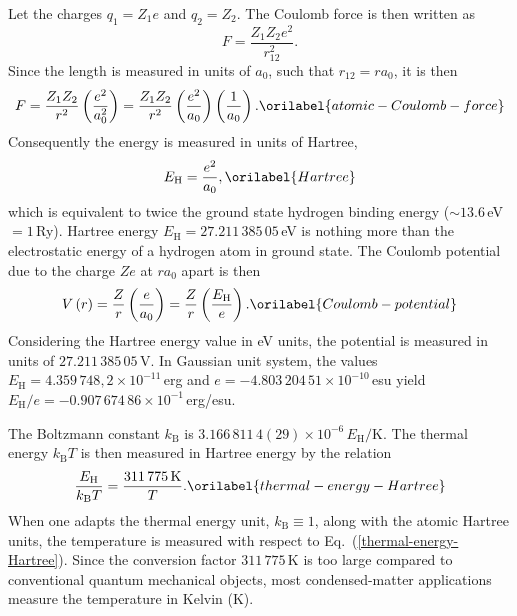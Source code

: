 \documentclass[aps,showkeys,noshowpacs,superscriptaddress,pre,preprint]{revtex4-2}
\let\label\orilabel
\begin{document}
Let the charges $q_1 = Z_1 e$ and $q_2 = Z_2$.
The Coulomb force is then written as
\begin{equation*}
F = \frac{Z_1 Z_2 e^2}{r_{12}^2} .
\end{equation*}
Since the length is measured in units of $a_0$, such that $r_{12} = r a_0$, 
it is then
\begin{equation}
F = \frac{Z_1 Z_2}{r^2} \left( \frac{e^2}{a_0^2} \right) 
= \frac{Z_1 Z_2}{r^2} \left( \frac{e^2}{a_0} \right) \left( \frac{1}{a_0} \right) .
\label{atomic-Coulomb-force}
\end{equation}
Consequently the energy is measured in units of Hartree,
\begin{equation}
E_\mathrm{H} = \frac{e^2}{a_0} ,
\label{Hartree}
\end{equation}
which is equivalent to twice the ground state hydrogen binding energy ($\sim 13.6$\,{eV} $= 1$\,{Ry}).
Hartree energy $E_\mathrm{H} = 27.211\,385\,05$\,{eV} is nothing more than the electrostatic energy 
of a hydrogen atom in ground state.
The Coulomb potential due to the charge $Ze$ at $r a_0$ apart is then
\begin{equation}
V\left( r \right) = \frac{Z}{r} \left( \frac{e}{a_0} \right)
= \frac{Z}{r} \left( \frac{E_\mathrm{H}}{e} \right) .
\label{Coulomb-potential}
\end{equation}
Considering the Hartree energy value in {eV} units, the potential is measured 
in units of $27.211\,385\,05$\,{V}.
In Gaussian unit system, the values $E_\mathrm{H} =4.359\,748,2 \times 10^{-11}$\,{erg} and  
$e = -4.803\,204\,51 \times 10^{-10}$\,{esu}
yield $E_\mathrm{H} / e = -0.907\,674\,86 \times 10^{-1}$\,{erg/esu}.

The Boltzmann constant $k_\mathrm{B}$ is $3.166\,811\,4(29) \times 10^{-6}$\,$E_\mathrm{H}/\mathrm{K}$.
The thermal energy $k_\mathrm{B} T$ is then measured in Hartree energy by the relation
\begin{equation}
\frac{E_\mathrm{H}}{k_\mathrm{B} T} = \frac{311\,775\,\mathrm{K}}{T} .
\label{thermal-energy-Hartree}
\end{equation}
When one adapts the thermal energy unit, $k_\mathrm{B} \equiv 1$,
along with the atomic Hartree units,
the temperature is measured with respect to Eq.~(\ref{thermal-energy-Hartree}).
Since the conversion factor $311\,775\,\mathrm{K}$ is too large compared to 
conventional quantum mechanical objects,
most condensed-matter applications measure the temperature in Kelvin (K).
\end{document}
